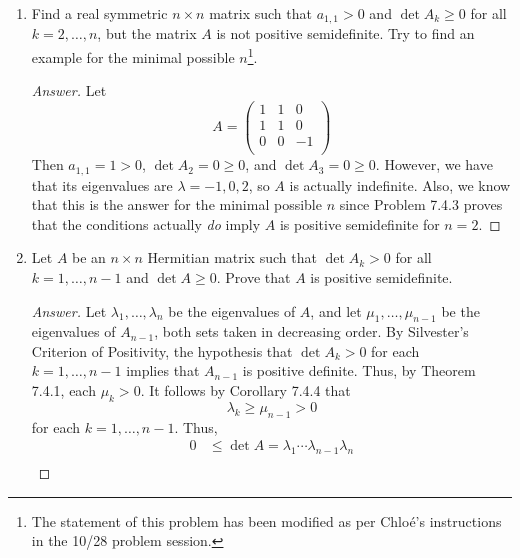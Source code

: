 \documentclass[../psets.tex]{subfiles}
\begin{document}
\begin{enumerate}[label={\textbf{4.\arabic*.}}]
\begin{proof}[Answer]
\begin{align*}
            0 &\leq \lambda_2
        \end{align*}
        Therefore, having shown that each $\lambda_k\geq 0$, Theorem 7.4.1 implies that $A$ is positive semidefinite, as desired.
    \end{proof}
    \item Find a real symmetric $n\times n$ matrix such that $a_{1,1}>0$ and $\det A_k\geq 0$ for all $k=2,\dots,n$, but the matrix $A$ is not positive semidefinite. Try to find an example for the minimal possible $n$\footnote{The statement of this problem has been modified as per Chlo\'{e}'s instructions in the 10/28 problem session.}.
    \begin{proof}[Answer]
        Let
        \begin{equation*}
            A =
            \begin{pmatrix}
                1 & 1 & 0\\
                1 & 1 & 0\\
                0 & 0 & -1\\
            \end{pmatrix}
        \end{equation*}
        Then $a_{1,1}=1>0$, $\det A_2=0\geq 0$, and $\det A_3=0\geq 0$. However, we have that its eigenvalues are $\lambda=-1,0,2$, so $A$ is actually indefinite. Also, we know that this is the answer for the minimal possible $n$ since Problem 7.4.3 proves that the conditions actually \emph{do} imply $A$ is positive semidefinite for $n=2$.
    \end{proof}
    \item Let $A$ be an $n\times n$ Hermitian matrix such that $\det A_k>0$ for all $k=1,\dots,n-1$ and $\det A\geq 0$. Prove that $A$ is positive semidefinite.
    \begin{proof}[Answer]
        Let $\lambda_1,\dots,\lambda_n$ be the eigenvalues of $A$, and let $\mu_1,\dots,\mu_{n-1}$ be the eigenvalues of $A_{n-1}$, both sets taken in decreasing order. By Silvester's Criterion of Positivity, the hypothesis that $\det A_k>0$ for each $k=1,\dots,n-1$ implies that $A_{n-1}$ is positive definite. Thus, by Theorem 7.4.1, each $\mu_k>0$. It follows by Corollary 7.4.4 that
        \begin{equation*}
            \lambda_k \geq \mu_{n-1} > 0
        \end{equation*}
        for each $k=1,\dots,n-1$. Thus,
        \begin{align*}
            0 &\leq \det A = \lambda_1\cdots\lambda_{n-1}\lambda_n\\

\end{align*}
\end{proof}
\end{enumerate}
\end{document}
